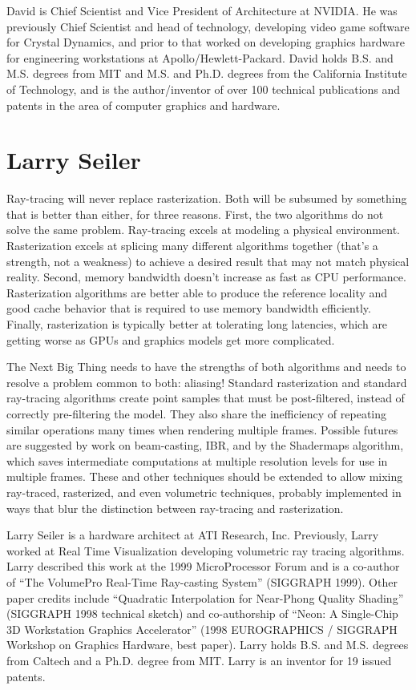 \documentclass{acmsiggraph}
\begin{document}
David is Chief Scientist and Vice President of Architecture at
NVIDIA.  He was previously Chief Scientist and head of technology,
developing video game software for Crystal Dynamics, and prior to that
worked on developing graphics hardware for engineering workstations at
Apollo/Hewlett-Packard.  David holds B.S. and M.S. degrees from MIT
and M.S. and Ph.D. degrees from the California Institute of
Technology, and is the author/inventor of over 100 technical
publications and patents in the area of computer graphics and
hardware.

\newpage
\section{Larry Seiler}

Ray-tracing will never replace rasterization. Both will be subsumed by
something that is better than either, for three reasons. First, the two
algorithms do not solve the same problem. Ray-tracing excels at modeling a
physical environment. Rasterization excels at splicing many different
algorithms together (that's a strength, not a weakness) to achieve a desired
result that may not match physical reality. Second, memory bandwidth doesn't
increase as fast as CPU performance. Rasterization algorithms are better
able to produce the reference locality and good cache behavior that is
required to use memory bandwidth efficiently. Finally, rasterization is
typically better at tolerating long latencies, which are getting worse as
GPUs and graphics models get more complicated. 

The Next Big Thing needs to have the strengths of both algorithms and needs
to resolve a problem common to both: aliasing! Standard rasterization and
standard ray-tracing algorithms create point samples that must be
post-filtered, instead of correctly pre-filtering the model. They also share
the inefficiency of repeating similar operations many times when rendering
multiple frames. Possible futures are suggested by work on beam-casting,
IBR, and by the Shadermaps algorithm, which saves intermediate computations
at multiple resolution levels for use in multiple frames. These and other
techniques should be extended to allow mixing ray-traced, rasterized, and
even volumetric techniques, probably implemented in ways that blur the
distinction between ray-tracing and rasterization.
\newline

Larry Seiler is a hardware architect at ATI Research, Inc. Previously, Larry
worked at Real Time Visualization developing volumetric ray tracing
algorithms. Larry described this work at the 1999 MicroProcessor Forum and
is a co-author of ``The VolumePro Real-Time Ray-casting System'' (SIGGRAPH
1999). Other paper credits include ``Quadratic Interpolation for Near-Phong
Quality Shading'' (SIGGRAPH 1998 technical sketch) and co-authorship of
``Neon: A Single-Chip 3D Workstation Graphics Accelerator'' (1998 EUROGRAPHICS
/ SIGGRAPH Workshop on Graphics Hardware, best paper). Larry holds B.S. and
M.S. degrees from Caltech and a Ph.D. degree from MIT. Larry is an inventor
for 19 issued patents.
\end{document}
